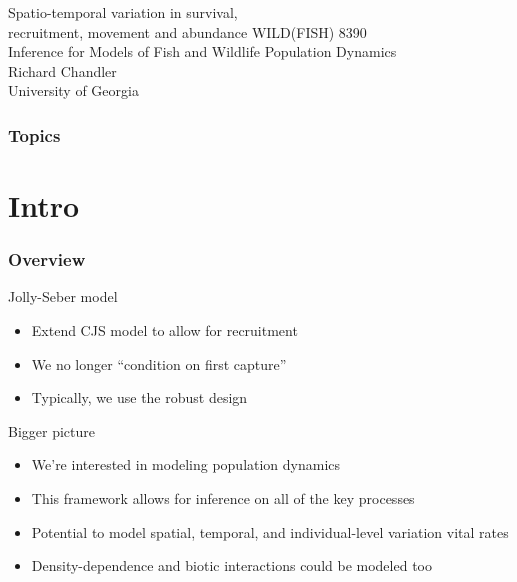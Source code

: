 \documentclass[color=usenames,dvipsnames]{beamer}
\begin{document}
\begin{frame}[plain]
  \centering
  \LARGE
  Spatio-temporal variation in %
  survival, \\ recruitment, movement and abundance %
  \vfill
  \large
  WILD(FISH) 8390 \\
  Inference for Models of Fish and Wildlife Population Dynamics \\
  \vfill
  Richard Chandler \\
  University of Georgia \\
\end{frame}







\begin{frame}[plain]
  \frametitle{Topics}
  \Large
\end{frame}




\section{Intro}






\begin{frame}
  \frametitle{Overview}
  {Jolly-Seber model}
  \begin{itemize}
    \normalsize
    \item Extend CJS model to allow for recruitment
    \item We no longer ``condition on first capture''
    \item Typically, we use the robust design
  \end{itemize}
  \pause \vfill
  Bigger picture
  \begin{itemize}
    \normalsize
    \item<2-> We're interested in modeling population dynamics
    \item<3-> This framework allows for inference on \alert{all} of the
      key processes 
    \item<4-> Potential to model spatial, temporal, and individual-level
      variation vital rates
    \item<5-> Density-dependence and biotic interactions could be
      modeled too
  \end{itemize}
\end{frame}
\end{document}
